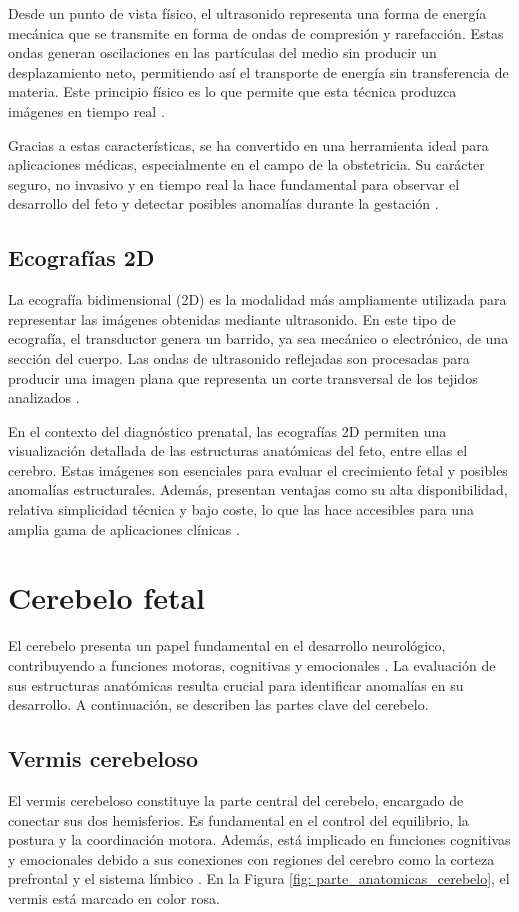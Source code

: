 Desde un punto de vista físico, el ultrasonido representa una forma de energía mecánica que se transmite en forma de ondas de compresión y rarefacción. Estas ondas generan oscilaciones en las partículas del medio sin producir un desplazamiento neto, permitiendo así el transporte de energía sin transferencia de materia. Este principio físico es lo que permite que esta técnica produzca imágenes en tiempo real \cite{leigthon2007ultrasound, ultrasonido}.

Gracias a estas características, se ha convertido en una herramienta ideal para aplicaciones médicas, especialmente en el campo de la obstetricia. Su carácter seguro, no invasivo y en tiempo real la hace fundamental para observar el desarrollo del feto y detectar posibles anomalías durante la gestación \cite{leigthon2007ultrasound}. 

\subsection{Ecografías 2D}
La ecografía bidimensional (2D) es la modalidad más ampliamente utilizada para representar las imágenes obtenidas mediante ultrasonido. En este tipo de ecografía, el transductor genera un barrido, ya sea mecánico o electrónico, de una sección del cuerpo. Las ondas de ultrasonido reflejadas son procesadas para producir una imagen plana que representa un corte transversal de los tejidos analizados \cite{ultrasonido}.

En el contexto del diagnóstico prenatal, las ecografías 2D permiten una visualización detallada de las estructuras anatómicas del feto, entre ellas el cerebro. Estas imágenes son esenciales para evaluar el crecimiento fetal y posibles anomalías estructurales. Además, presentan ventajas como su alta disponibilidad, relativa simplicidad técnica y bajo coste, lo que las hace accesibles para una amplia gama de aplicaciones clínicas \cite{2dultrasound}.

\section {Cerebelo fetal}
El cerebelo presenta un papel fundamental en el desarrollo neurológico, contribuyendo a funciones motoras, cognitivas y emocionales \cite{schmahmann1998cerebellum}. La evaluación de sus estructuras anatómicas resulta crucial para identificar anomalías en su desarrollo. A continuación, se describen las partes clave del cerebelo.
\subsection{Vermis cerebeloso}
El vermis cerebeloso constituye la parte central del cerebelo, encargado de conectar sus dos hemisferios. Es fundamental en el control del equilibrio, la postura y la coordinación motora. Además, está implicado en funciones cognitivas y emocionales debido a sus conexiones con regiones del cerebro como la corteza prefrontal y el sistema límbico \cite{wolf2009vermis}. En la Figura \ref{fig: parte_anatomicas_cerebelo}, el vermis está marcado en color rosa.

